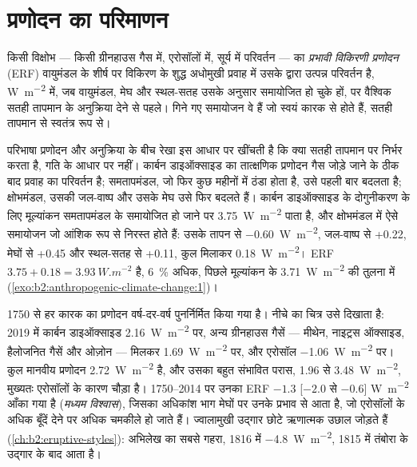\section{प्रणोदन का परिमाणन}\label{sec:b2:anthropogenic-climate-change:forcing}

\begin{definition}[प्रभावी विकिरणी प्रणोदन]\label{def:b2:anthropogenic-climate-change:erf}
किसी विक्षोभ --- किसी ग्रीनहाउस गैस में, एरोसॉलों में, सूर्य में परिवर्तन --- का \emph{प्रभावी विकिरणी
प्रणोदन} (ERF) वायुमंडल के शीर्ष पर विकिरण के शुद्ध अधोमुखी प्रवाह में
उसके द्वारा उत्पन्न परिवर्तन है, \unit{W.m^{-2}} में, जब वायुमंडल, मेघ और स्थल-सतह उसके अनुसार
समायोजित हो चुके हों, पर वैश्विक सतही तापमान के अनुक्रिया देने से पहले। गिने गए समायोजन वे हैं जो
स्वयं कारक से होते हैं, सतही तापमान से स्वतंत्र
रूप से।
\end{definition}

परिभाषा प्रणोदन और अनुक्रिया के बीच रेखा इस आधार पर खींचती है कि क्या सतही तापमान पर निर्भर करता है,
गति के आधार पर नहीं। कार्बन डाइऑक्साइड का तात्क्षणिक प्रणोदन गैस जोड़े जाने के ठीक बाद प्रवाह का परिवर्तन
है; समतापमंडल, जो फिर कुछ महीनों में ठंडा होता है, उसे पहली बार बदलता है; क्षोभमंडल, उसकी जल-वाष्प
और उसके मेघ उसे फिर बदलते हैं। कार्बन डाइऑक्साइड के दोगुनीकरण के लिए मूल्यांकन समतापमंडल के
समायोजित हो जाने पर \qty{3.75}{W.m^{-2}} पाता है, और क्षोभमंडल में ऐसे समायोजन जो आंशिक रूप से
निरस्त होते हैं: उसके तापन से \qty{-0.60}{W.m^{-2}}, जल-वाष्प से +0.22, मेघों से +0.45 और स्थल-सतह से
+0.11, कुल मिलाकर \qty{+0.18}{W.m^{-2}}।
ERF $3.75 + 0.18 = \qty{3.93}{W.m^{-2}}$ है, \qty{6}{\percent} अधिक, पिछले मूल्यांकन के
\qty{3.71}{W.m^{-2}} की तुलना में (\cref{exo:b2:anthropogenic-climate-change:1})।

1750 से हर कारक का प्रणोदन वर्ष-दर-वर्ष पुनर्निर्मित किया गया है। नीचे का चित्र उसे दिखाता है:
2019 में कार्बन डाइऑक्साइड \qty{2.16}{W.m^{-2}} पर, अन्य ग्रीनहाउस गैसें --- मीथेन,
नाइट्रस ऑक्साइड, हैलोजनित गैसें और ओज़ोन --- मिलकर \qty{1.69}{W.m^{-2}} पर, और
एरोसॉल \qty{-1.06}{W.m^{-2}} पर। कुल मानवीय प्रणोदन \qty{2.72}{W.m^{-2}} है, और उसका बहुत
संभावित परास, 1.96 से \qty{3.48}{W.m^{-2}}, मुख्यतः एरोसॉलों के कारण चौड़ा है। 1750--2014 पर उनका ERF
$-1.3$ [$-2.0$ से $-0.6$] \unit{W.m^{-2}} आँका गया है (\emph{मध्यम विश्वास}),
जिसका अधिकांश भाग मेघों पर उनके प्रभाव से आता है, जो एरोसॉलों के अधिक बूँदें देने पर अधिक चमकीले हो जाते हैं।
ज्वालामुखी उद्गार छोटे ऋणात्मक उछाल जोड़ते हैं (\cref{ch:b2:eruptive-styles}): अभिलेख का सबसे गहरा,
1816 में \qty{-4.8}{W.m^{-2}}, 1815 में तंबोरा के उद्गार के बाद आता है।

